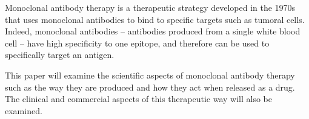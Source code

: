 Monoclonal antibody therapy is a therapeutic strategy developed in the 1970s
that uses monoclonal antibodies to bind to specific targets such as tumoral cells.
Indeed, monoclonal antibodies -- antibodies produced from a single white blood cell --
have high specificity to one epitope, and therefore can be used to specifically target
an antigen.

This paper will examine the scientific aspects of monoclonal antibody therapy
such as the way they are produced and how they act when released as a drug.
The clinical and commercial aspects of this therapeutic way will also be examined.
